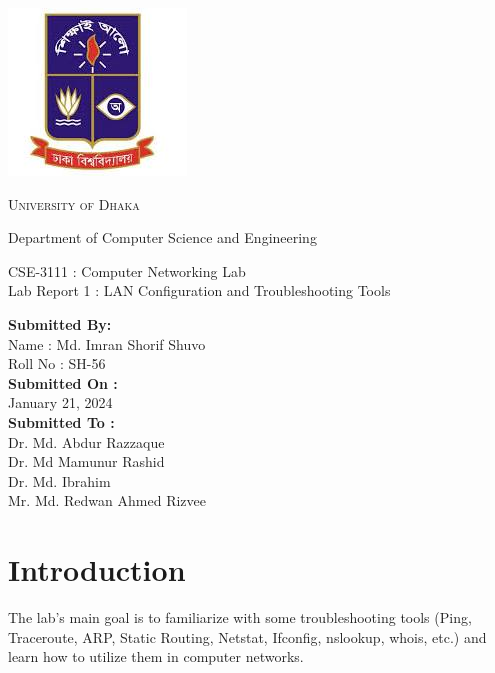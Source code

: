 \documentclass[11pt]{article}
\begin{document}
\begin{titlepage}
	\begin{center}
		\includegraphics[scale=0.10]{du.jpeg}\par
		\begin{Huge}
			\textsc{University of Dhaka}\par
		\end{Huge}
		\begin{Large}
			Department of Computer Science and Engineering\par \vspace{1cm}
			CSE-3111 : Computer Networking Lab \\[12pt]
			Lab Report 1 : LAN Configuration and Troubleshooting Tools
		\end{Large}
	\end{center}
	\begin{large}
		\textbf{Submitted By:\\[12pt]}
		Name : Md. Imran Shorif Shuvo\\[8pt]
		Roll No : SH-56\\[12pt]
		\textbf{Submitted On : \\[12pt]}
		January 21, 2024\\[20pt]
		\textbf{Submitted To :\\[12pt]}
		Dr. Md. Abdur Razzaque\\[12pt]
		Dr. Md Mamunur Rashid\\[12pt]
		Dr. Md. Ibrahim\\[12pt]
		Mr. Md. Redwan Ahmed Rizvee
	\end{large}
\end{titlepage}

\section{Introduction}
The lab's main goal is to familiarize with some troubleshooting tools (Ping, Traceroute, ARP, Static Routing, Netstat, Ifconfig, nslookup, whois, etc.) and learn how to utilize them in computer networks.
\end{document}
